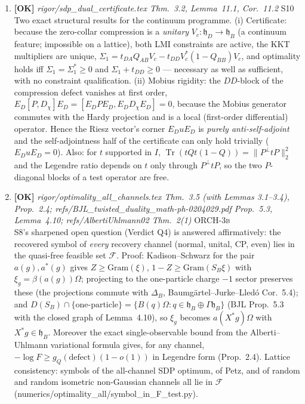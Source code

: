 \documentclass[11pt]{article}
\begin{document}
\begin{enumerate}[leftmargin=1.6em,itemsep=6pt]
\item \textbf{[OK]} \emph{rigor/sdp\_dual\_certificate.tex Thm.~3.2, Lemma~11.1, Cor.~11.2} \hfill\textsc{S10}\\ Two exact structural results for the continuum programme. (i) Certificate: because the zero-collar compression is a \emph{unitary} $V_c:\mathfrak h_D\to\mathfrak h_B$ (a continuum feature; impossible on a lattice), both LMI constraints are active, the KKT multipliers are unique, $\Sigma_1=t_{DA}Q_{AB}V_c-t_{DD}V_c^*(1-Q_{BB})V_c$, and optimality holds iff $\Sigma_1=\Sigma_1^*\ge0$ and $\Sigma_1+t_{DD}\ge0$ --- necessary as well as sufficient, with no constraint qualification. (ii) Mobius rigidity: the $DD$-block of the compression defect vanishes at first order, $E_D[P,D_\chi]E_D=[E_DPE_D,E_DD_\chi E_D]=0$, because the Mobius generator commutes with the Hardy projection and is a local (first-order differential) operator. Hence the Riesz vector's corner $E_DuE_D$ is \emph{purely anti-self-adjoint} and the self-adjointness half of the certificate can only hold trivially ($E_DuE_D=0$). Also: for $t$ supported in $I$, $\operatorname{Tr}(tQt(1-Q))=\lVert P^\perp tP\rVert_2^2$ and the Legendre ratio depends on $t$ only through $P^\perp tP$, so the two $P$-diagonal blocks of a test operator are free.
\item \textbf{[OK]} \emph{rigor/optimality\_all\_channels.tex Thm.~3.5 (with Lemmas 3.1--3.4), Prop.~2.4; refs/BJL\_twisted\_duality\_math-ph-0204029.pdf Prop.~5.3, Lemma~4.10; refs/AlbertiUhlmann02 Thm.~2(1)} \hfill\textsc{ORCH-3b}\\ S8's sharpened open question (Verdict Q4) is answered affirmatively: the recovered symbol of \emph{every} recovery channel (normal, unital, CP, even) lies in the quasi-free feasible set \(\mathcal F\). Proof: Kadison--Schwarz for the pair \(a(g),a^*(g)\) gives \(Z\ge\mathrm{Gram}(\xi)\), \(1-Z\ge\mathrm{Gram}(S_B\xi)\) with \(\xi_g=\beta(a(g))\Omega\); projecting to the one-particle charge \(-1\) sector preserves these (the projections commute with \(\Delta_B\), Baumg\"artel--Jurke--Lled\'o Cor.~5.4); and \(D(S_B)\cap\{\text{one-particle}\}=\{B(q)\Omega:q\in\mathfrak h_B\oplus\Gamma\mathfrak h_B\}\) (BJL Prop.~5.3 with the closed graph of Lemma~4.10), so \(\xi_g\) becomes \(a(X^*g)\Omega\) with \(X^*g\in\mathfrak h_B\). Moreover the exact single-observable bound from the Alberti--Uhlmann variational formula gives, for any channel, \(-\log F\ge g_Q(\text{defect})(1-o(1))\) in Legendre form (Prop.~2.4). Lattice consistency: symbols of the all-channel SDP optimum, of Petz, and of random and random isometric non-Gaussian channels all lie in \(\mathcal F\) (numerics/optimality\_all/symbol\_in\_F\_test.py).

\end{enumerate}
\end{document}
